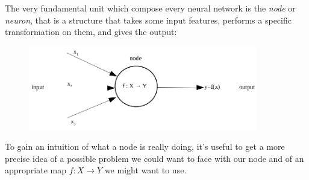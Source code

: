 \documentclass[12pt, a4paper]{report}
\theoremstyle{definition}
\begin{document}
The very fundamental unit which compose every neural network is the \textit{node} or \textit{neuron}, that is a structure that takes some input features, performs a specific transformation on them, and gives the output:
\begin{figure}[h]
\centering
\includegraphics[width=10cm]{img/node}
\caption{}\label{fig1}
\end{figure}
\newline To gain an intuition of what a node is really doing, it's useful to get a more precise idea of a possible problem we could want to face with our node and of an appropriate map $f:X\rightarrow Y$ we might want to use.
\end{document}
